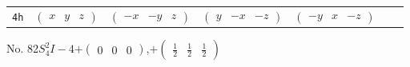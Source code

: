\documentclass[fleqn,9pt,landscape]{jsarticle}
\begin{document}
\begin{center}
\begin{longtable}{ccccccc}
{\tt 4h} & $ \begin{pmatrix} x & y & z \end{pmatrix} $ & $ \begin{pmatrix} - x & - y & z \end{pmatrix} $ & $ \begin{pmatrix} y & - x & - z \end{pmatrix} $ & $ \begin{pmatrix} - y & x & - z \end{pmatrix} $ \\
\end{longtable}
\end{center}
\newpage
No. 82\quad$S_{4}^{2}$\quad$I-4$\quad[ tetragonal ]\quad$+\begin{pmatrix} 0 & 0 & 0 \end{pmatrix}$,\quad $+\begin{pmatrix} \frac{1}{2} & \frac{1}{2} & \frac{1}{2} \end{pmatrix}$
\end{document}
